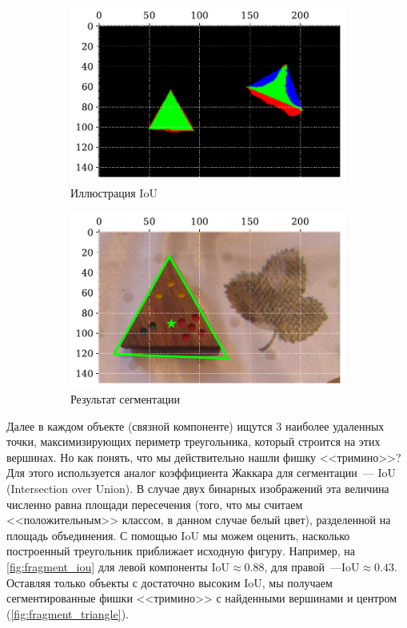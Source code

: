 \documentclass[12pt]{article}
\begin{document}
\begin{figure}[!h]
    \begin{subfigure}{.45\linewidth}
        \includegraphics[width=.93\linewidth]{fragment_iou.pdf}
        \centering
        \caption{Иллюстрация IoU}
        \label{fig:fragment_iou}
    \end{subfigure}
    \begin{subfigure}{.45\linewidth}
        \includegraphics[width=.93\linewidth]{fragment_triangle.pdf}
        \centering
        \caption{Результат сегментации}
        \label{fig:fragment_triangle}
    \end{subfigure}
    \centering
    \caption{}
\end{figure}

Далее в каждом объекте (связной компоненте) ищутся 3 наиболее удаленных точки, максимизирующих периметр треугольника, который строится на этих вершинах. Но как понять, что мы действительно нашли фишку <<тримино>>? Для этого используется аналог коэффициента Жаккара для сегментации~--- IoU (Intersection over Union). В случае двух бинарных изображений эта величина численно равна площади пересечения (того, что мы считаем <<положительным>> классом, в данном случае белый цвет), разделенной на площадь объединения. С помощью IoU мы можем оценить, насколько построенный треугольник приближает исходную фигуру. Например, на \autoref{fig:fragment_iou} для левой компоненты $\text{IoU}\approx 0.88$, для правой~---$\text{IoU}\approx 0.43$. Оставляя только объекты с достаточно высоким IoU, мы получаем сегментированные фишки <<тримино>> с найденными вершинами и центром (\autoref{fig:fragment_triangle}). 
\end{document}
